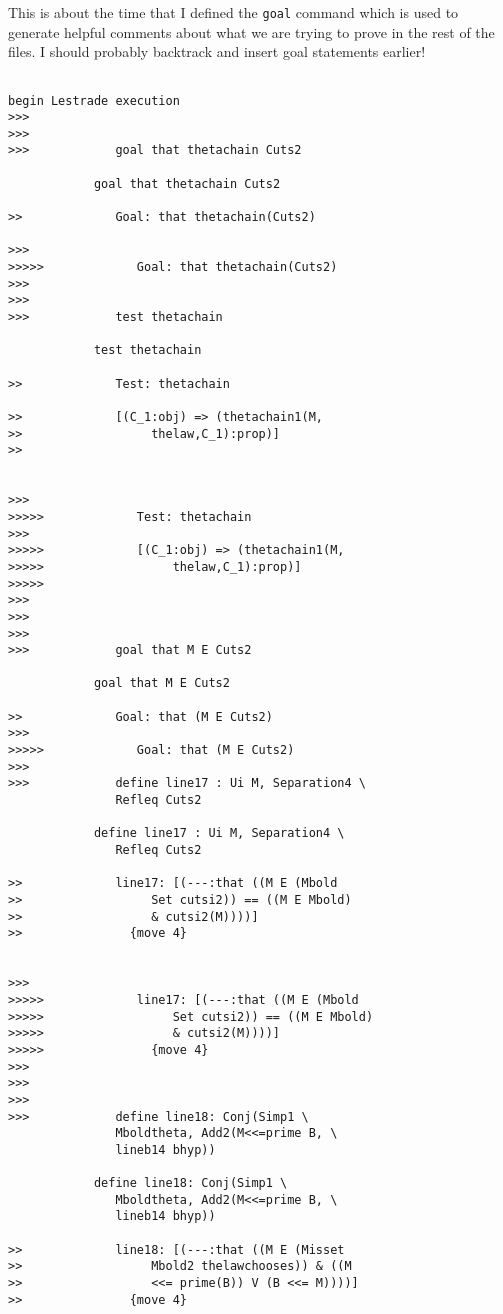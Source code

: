 \documentclass[12pt]{article}
\begin{document}
This is about the time that I defined the {\tt goal} command which is used to generate helpful comments about what we are trying to prove in the rest of the files.  I should probably
backtrack and insert goal statements earlier!


\begin{verbatim}

begin Lestrade execution
>>>
>>>
>>>            goal that thetachain Cuts2

            goal that thetachain Cuts2

>>             Goal: that thetachain(Cuts2)

>>>
>>>>>             Goal: that thetachain(Cuts2)
>>>
>>>
>>>            test thetachain

            test thetachain

>>             Test: thetachain

>>             [(C_1:obj) => (thetachain1(M,
>>                  thelaw,C_1):prop)]
>>               


>>>
>>>>>             Test: thetachain
>>>
>>>>>             [(C_1:obj) => (thetachain1(M,
>>>>>                  thelaw,C_1):prop)]
>>>>>               
>>>
>>>
>>>
>>>            goal that M E Cuts2

            goal that M E Cuts2

>>             Goal: that (M E Cuts2)
>>>
>>>>>             Goal: that (M E Cuts2)
>>>
>>>            define line17 : Ui M, Separation4 \
               Refleq Cuts2

            define line17 : Ui M, Separation4 \
               Refleq Cuts2

>>             line17: [(---:that ((M E (Mbold
>>                  Set cutsi2)) == ((M E Mbold)
>>                  & cutsi2(M))))]
>>               {move 4}


>>>
>>>>>             line17: [(---:that ((M E (Mbold
>>>>>                  Set cutsi2)) == ((M E Mbold)
>>>>>                  & cutsi2(M))))]
>>>>>               {move 4}
>>>
>>>
>>>
>>>            define line18: Conj(Simp1 \
               Mboldtheta, Add2(M<<=prime B, \
               lineb14 bhyp))

            define line18: Conj(Simp1 \
               Mboldtheta, Add2(M<<=prime B, \
               lineb14 bhyp))

>>             line18: [(---:that ((M E (Misset
>>                  Mbold2 thelawchooses)) & ((M
>>                  <<= prime(B)) V (B <<= M))))]
>>               {move 4}



\end{verbatim}
\end{document}

